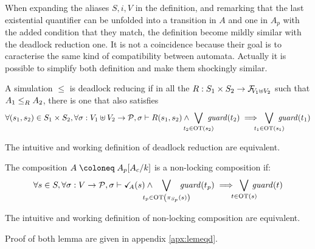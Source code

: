 \documentclass{article}
\begin{document}
When expanding the aliases \(S, i, V\) in the definition, and remarking that the last existential quantifier can be unfolded into a transition in \(A\) and one in \(A_p\) with the added condition that they match, the definition become mildly similar with the deadlock reduction one.
It is not a coincidence because their goal is to caracterise the same kind of compatibility between automata.
Actually it is possible to simplify both definition and make them shockingly similar.

\begin{defi}
A simulation \(\leq\) is deadlock reducing if in all the \(R: S_1 \times S_2 \to \rformulae[V_1 \uplus V_2]\) such that \(\wrel{A_1}{A_2}{R}\), there is one that also satisfies
\[ \forall \mpar{s_1, s_2} \in S_1 \times S_2, \forall \sigma: V_1 \uplus V_2 \to \values, \sigma \vdash R\mpar{s_1, s_2} \wedge \bigvee_\subbox{t_2 \in \fOT{s_2}} \fguard{t_2} \implies \bigvee_\subbox{t_1 \in \fOT{s_1}} \fguard{t_1} \]
\end{defi}
\begin{lem}
The intuitive and working definition of deadlock reduction are equivalent.
\end{lem}

\begin{defi}
The composition \(A \defobject A_p\subst{A_c}{k}\) is a non-locking composition if:
\[ \forall s \in S, \forall \sigma: V \to \values, \sigma \vdash \reach{A}\mpar{s} \wedge \bigvee_\subbox{t_p \in \fOT{\pi_{S_p}\mpar{s}}} \fguard{t_p} \implies \bigvee_\subbox{t \in \fOT{s}} \fguard{t} \]
\end{defi}
\begin{lem}
The intuitive and working definition of non-locking composition are equivalent.
\end{lem}
Proof of both lemma are given in appendix \ref{apx:lemeqd}.

\end{document}
